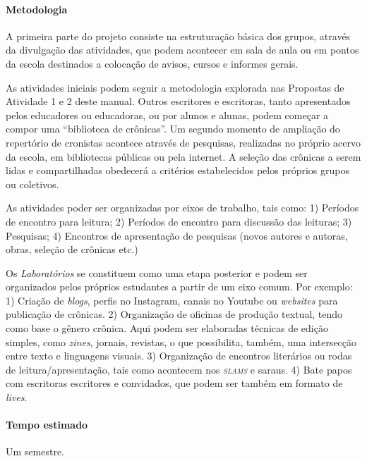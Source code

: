\documentclass{extarticle}
\begin{document}
\paragraph{Metodologia} A primeira parte do projeto consiste na
estruturação básica dos grupos, através da divulgação das atividades,
que podem acontecer em sala de aula ou em pontos da escola destinados a
colocação de avisos, cursos e informes gerais.

As atividades iniciais podem seguir a metodologia explorada nas
Propostas de Atividade 1 e 2 deste manual. Outros escritores e
escritoras, tanto apresentados pelos educadores ou educadoras, ou por
alunos e alunas, podem começar a compor uma ``biblioteca de crônicas''.
Um segundo momento de ampliação do repertório de cronistas acontece
através de pesquisas, realizadas no próprio acervo da escola, em
bibliotecas públicas ou pela internet. A seleção das crônicas a serem
lidas e compartilhadas obedecerá a critérios estabelecidos pelos
próprios grupos ou coletivos.

As atividades poder ser organizadas por eixos de trabalho, tais como: 1)
Períodos de encontro para leitura; 2) Períodos de encontro para
discussão das leituras; 3) Pesquisas; 4) Encontros de apresentação de
pesquisas (novos autores e autoras, obras, seleção de crônicas etc.)

Os \textit{Laboratórios} se constituem como uma etapa posterior e podem
ser organizados pelos próprios estudantes a partir de um eixo comum. Por
exemplo: 1) Criação de \emph{blogs}, perfis no Instagram, canais no
Youtube ou \emph{websites} para publicação de crônicas. 2) Organização
de oficinas de produção textual, tendo como base o gênero crônica. Aqui
podem ser elaboradas técnicas de edição simples, como \emph{zines},
jornais, revistas, o que possibilita, também, uma intersecção entre
texto e linguagens visuais. 3) Organização de encontros literários ou
rodas de leitura/apresentação, tais como acontecem nos \emph{\textsc{slams}} e
saraus. 4) Bate papos com escritoras escritores e convidados, que podem
ser também em formato de \emph{lives}.

\paragraph{Tempo estimado} Um semestre.

\end{document}
